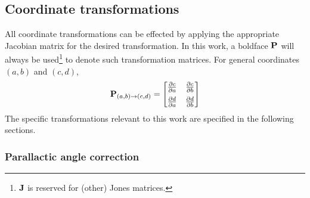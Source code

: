 \documentclass{book}
\newcommand{\pd}[2]{\ensuremath{\frac{\partial #1}{\partial #2}}}
\newcommand{\transmat}[4]{\ensuremath{{\bf P}_{(#1,#2)\rightarrow(#3,#4)}}}
\begin{document}
\subsection{Coordinate transformations}

All coordinate transformations can be effected by applying the appropriate Jacobian matrix for the desired transformation.
In this work, a boldface ${\bf P}$ will always be used\footnote{${\bf J}$ is reserved for (other) Jones matrices.} to denote such transformation matrices.
For general coordinates $(a,b)$ and $(c,d)$,
\begin{equation}
    \transmat{a}{b}{c}{d} =
    \begin{bmatrix}
        \pd{c}{a} & \pd{c}{b} \\[5 pt]
        \pd{d}{a} & \pd{d}{b}
    \end{bmatrix}
\end{equation}
The specific transformations relevant to this work are specified in the following sections.

\subsubsection{Parallactic angle correction}
\end{document}
